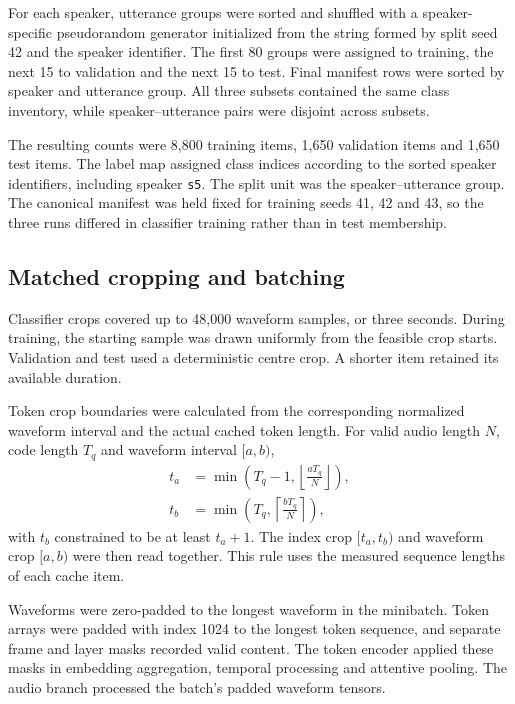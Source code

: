 For each speaker, utterance groups were sorted and shuffled with a speaker-specific pseudorandom generator initialized from the string formed by split seed 42 and the speaker identifier. The first 80 groups were assigned to training, the next 15 to validation and the next 15 to test. Final manifest rows were sorted by speaker and utterance group. All three subsets contained the same class inventory, while speaker--utterance pairs were disjoint across subsets.

The resulting counts were 8,800 training items, 1,650 validation items and 1,650 test items. The label map assigned class indices according to the sorted speaker identifiers, including speaker \texttt{s5}. The split unit was the speaker--utterance group. The canonical manifest was held fixed for training seeds 41, 42 and 43, so the three runs differed in classifier training rather than in test membership.

\subsection{Matched cropping and batching}
Classifier crops covered up to 48,000 waveform samples, or three seconds. During training, the starting sample was drawn uniformly from the feasible crop starts. Validation and test used a deterministic centre crop. A shorter item retained its available duration.

Token crop boundaries were calculated from the corresponding normalized waveform interval and the actual cached token length. For valid audio length $N$, code length $T_q$ and waveform interval $[a,b)$,
\begin{align}
 t_a&=\min\left(T_q-1,\left\lfloor\frac{aT_q}{N}\right\rfloor\right),
 \nonumber\\
 t_b&=\min\left(T_q,\left\lceil\frac{bT_q}{N}\right\rceil\right),
 \label{eq:sv2-crop}
\end{align}
with $t_b$ constrained to be at least $t_a+1$. The index crop $[t_a,t_b)$ and waveform crop $[a,b)$ were then read together. This rule uses the measured sequence lengths of each cache item.

Waveforms were zero-padded to the longest waveform in the minibatch. Token arrays were padded with index 1024 to the longest token sequence, and separate frame and layer masks recorded valid content. The token encoder applied these masks in embedding aggregation, temporal processing and attentive pooling. The audio branch processed the batch's padded waveform tensors.

